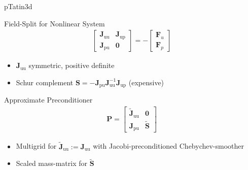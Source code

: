 \begin{frame}{pTatin3d}

  \begin{block}{Field-Split for Nonlinear System}
        \begin{align*}
          \left[ \begin{array}{cc} \mathbf{J}_\mathrm{uu}  &  \mathbf{J}_\mathrm{up} \\
                                   \mathbf{J}_\mathrm{pu}  &  \mathbf 0
                 \end{array} \right]
                 = - \left[
                 \begin{array}{c}
                  \mathbf F_u \\
                  \mathbf F_p
                 \end{array} \right]
         \end{align*}
  \begin{itemize}
   \item $\mathbf{J}_\mathrm{uu}$ symmetric, positive definite
   \item Schur complement $\mathbf{S} = -  \mathbf{J}_\mathrm{pu}  \mathbf{J}_\mathrm{uu}^{-1} \mathbf{J}_\mathrm{up}$ (expensive)
  \end{itemize}
  \end{block}
  
  \begin{block}{Approximate Preconditioner}
    \begin{align*} \mathbf P = \left[
      \begin{array}{cc}
        \tilde{\mathbf{J}}_\mathrm{uu}  &  \mathbf 0 \\
               \mathbf{J}_\mathrm{pu}  &  \tilde{\mathbf S}
      \end{array} \right]
    \end{align*}
   \begin{itemize}
    \item Multigrid for $\tilde{\mathbf{J}}_\mathrm{uu} := \mathbf{J}_\mathrm{uu}$ with Jacobi-preconditioned Chebychev-smoother
    \item Scaled mass-matrix for $\tilde{\mathbf S}$
   \end{itemize}

  \end{block}


\end{frame}



